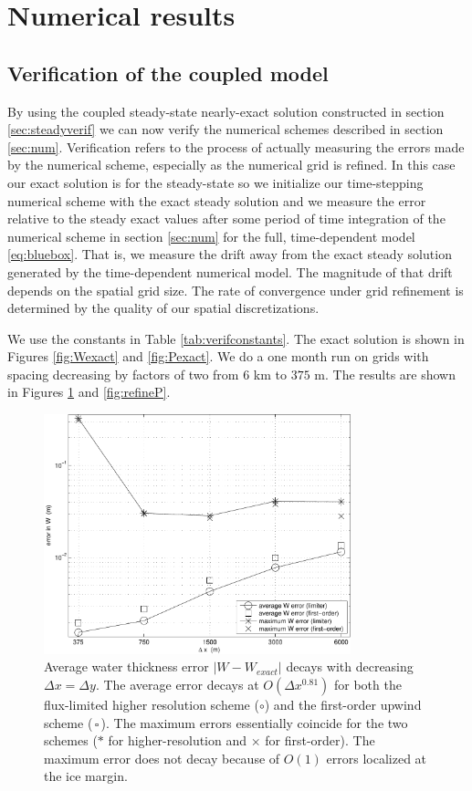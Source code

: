\documentclass[11pt,final]{amsart}%
\begin{document}
\section{Numerical results}  \label{sec:results}

\subsection*{Verification of the coupled model}  By using the coupled steady-state nearly-exact solution constructed in section \ref{sec:steadyverif} we can now verify the numerical schemes described in section \ref{sec:num}.  Verification refers to the process of actually measuring the errors made by the numerical scheme, especially as the numerical grid is refined.  In this case our exact solution is for the steady-state so we initialize our time-stepping numerical scheme with the exact steady solution and we measure the error relative to the steady exact values after some period of time integration of the numerical scheme in section \ref{sec:num} for the full, time-dependent model \eqref{eq:bluebox}.  That is, we measure the drift away from the exact steady solution generated by the time-dependent numerical model.  The magnitude of that drift depends on the spatial grid size.  The rate of convergence under grid refinement is determined by the quality of our spatial discretizations.

We use the constants in Table \ref{tab:verifconstants}.  The exact solution is shown in Figures \ref{fig:Wexact} and \ref{fig:Pexact}.  We do a one month run on grids with spacing decreasing by factors of two from $6$ km to $375$ m.  The results are shown in Figures \ref{fig:refineW} and \ref{fig:refineP}.

\begin{figure}[ht]
\includegraphics[width=3.5in,keepaspectratio=true]{figs/refineW}
\caption{Average water thickness error $|W-W_{exact}|$ decays with decreasing $\Delta x = \Delta y$.  The average error decays at $O(\Delta x^{0.81})$ for both the flux-limited higher resolution scheme (\Large$\circ$\normalsize) and the first-order upwind scheme (\scriptsize\,$\square$\,\normalsize).  The maximum errors essentially coincide for the two schemes (\large$\ast$ \normalsize for higher-resolution and $\times$ for first-order).  The maximum error does not decay because of $O(1)$ errors localized at the ice margin.}
\label{fig:refineW}
\end{figure}
\end{document}
